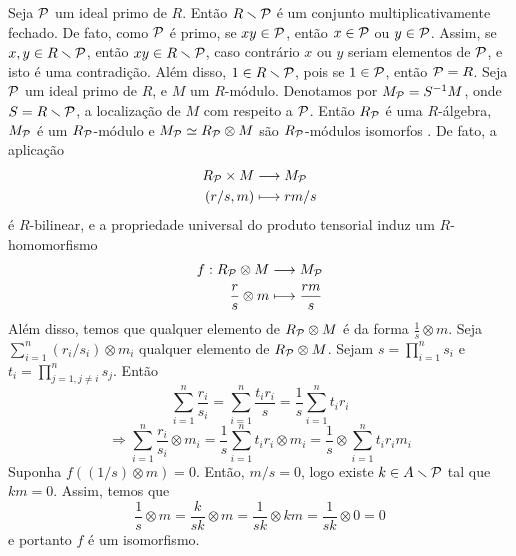 Seja $\mathcal{P}$ um ideal primo de $R$. Então $R\smallsetminus \mathcal{P}$ é um conjunto multiplicativamente fechado. De fato, como $\mathcal{P}$ é primo, se $xy \in \mathcal{P}$, então $x \in \mathcal{P}$ ou $y \in \mathcal{P}$. Assim, se $x, y \in R\smallsetminus \mathcal{P}$, então $xy \in R\smallsetminus\mathcal{P}$, caso contrário $x$ ou $y$ seriam elementos de $\mathcal{P}$, e isto é uma contradição. Além disso, $1 \in R\smallsetminus\mathcal{P}$, pois se $1 \in \mathcal{P}$, então $\mathcal{P} = R$.
Seja $\mathcal{P}$ um ideal primo de $R$,\label{localiza} e $M$ um $R$-módulo. Denotamos por $M_{\mathcal{P}} = S^{-1}M$, onde $S=R\smallsetminus \mathcal{P}$, a localização de $M$ com respeito a $\mathcal{P}$. Então $R_{\mathcal{P}}$ é uma $R$-álgebra, $M_{\mathcal{P}}$ é um $R_{\mathcal{P}}$-módulo e $M_{\mathcal{P}} \simeq R_{\mathcal{P}}\otimes M$ são $R_{\mathcal{P}}$-módulos isomorfos \cite{atiyah}. De fato, a aplicação
\begin{align*}
    R_{\mathcal{P}} \times M &\longrightarrow M_{\mathcal{P}} \\
    (r/s, m) &\longmapsto rm/s
\end{align*}
é $R$-bilinear, e a propriedade universal do produto tensorial induz um $R$-homomorfismo
\begin{align*}
    f: R_{\mathcal{P}} \otimes M &\longrightarrow M_{\mathcal{P}} \\
    \frac{r}{s}\otimes m &\longmapsto \frac{rm}{s}
\end{align*}
Além disso, temos que qualquer elemento de $R_{\mathcal{P}} \otimes M$ é da forma $\frac{1}{s}\otimes m$. Seja $\sum_{i=1}^{n} \left( r_i / s_i \right) \otimes m_i$ qualquer elemento de $R_{\mathcal{P}}\otimes M$. Sejam $s = \prod_{i=1}^{n} s_i$ e $t_i = \prod_{j=1, j\neq i}^{n} s_j$. Então 
\[\sum_{i=1}^{n} \dfrac{r_i}{s_i} = \sum_{i=1}^{n} \dfrac{t_i r_i}{s} = \dfrac{1}{s}\sum_{i=1}^{n} t_i r_i \]
\[\Rightarrow \sum_{i=1}^{n} \frac{r_i}{s_i} \otimes m_i = \dfrac{1}{s}\sum_{i=1}^{n} t_i r_i \otimes m_i = \dfrac{1}{s} \otimes \sum_{i=1}^{n} t_i r_i m_i \]
Suponha $f\left( (1/s) \otimes m\right) =0$. Então, $m/s = 0$, logo existe $k \in A\smallsetminus \mathcal{P}$ tal que $km=0$. Assim, temos que 
\[\dfrac{1}{s}\otimes m = \dfrac{k}{sk}\otimes m = \dfrac{1}{sk}\otimes km = \dfrac{1}{sk} \otimes 0 = 0\]
e portanto $f$ é um isomorfismo.

